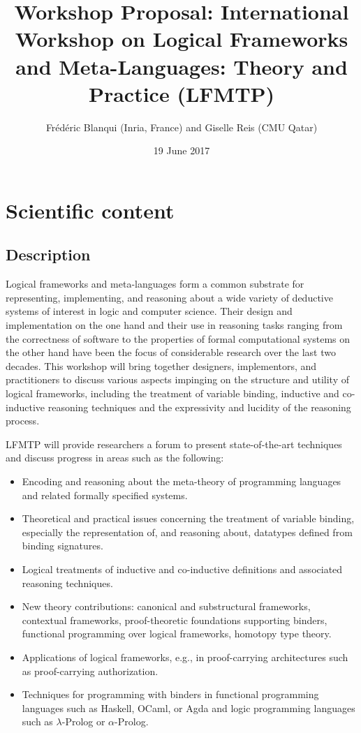\documentclass{article}
\begin{document}
\title{\bf Workshop Proposal: International Workshop on Logical
       Frameworks and Meta-Languages: Theory and Practice (LFMTP)}

\author{Fr\'ed\'eric Blanqui (Inria, France) and Giselle Reis (CMU Qatar)}

\date{19 June 2017}

\maketitle

\section{Scientific content}

\subsection{Description}

  Logical frameworks and meta-languages form a common substrate for
  representing, implementing, and reasoning about a wide variety of
  deductive systems of interest in logic and computer science. Their
  design and implementation on the one hand and their use in reasoning
  tasks ranging from the correctness of software to the properties of
  formal computational systems on the other hand have been the focus
  of considerable research over the last two decades. This workshop
  will bring together designers, implementors, and practitioners to
  discuss various aspects impinging on the structure and utility of
  logical frameworks, including the treatment of variable binding,
  inductive and co-inductive reasoning techniques and the expressivity
  and lucidity of the reasoning process.

  LFMTP will provide researchers a forum to present state-of-the-art 
  techniques and discuss progress in areas such as the following:
\begin{itemize}
\item Encoding and reasoning about the meta-theory of programming
    languages and related formally specified systems.
\item Theoretical and practical issues concerning the treatment of
    variable binding, especially the representation of, and reasoning
    about, datatypes defined from binding signatures.
\item Logical treatments of inductive and co-inductive definitions and
    associated reasoning techniques.
\item New theory contributions: canonical and substructural frameworks,
    contextual frameworks, proof-theoretic foundations supporting
    binders, functional programming over logical frameworks, homotopy
    type theory.  
\item Applications of logical frameworks, e.g., in proof-carrying
    architectures such as proof-carrying authorization.
\item Techniques for programming with binders in functional programming
    languages such as Haskell, OCaml, or Agda and logic programming
    languages such as $\lambda$-Prolog or $\alpha$-Prolog.
\end{itemize}
  
\end{document}

